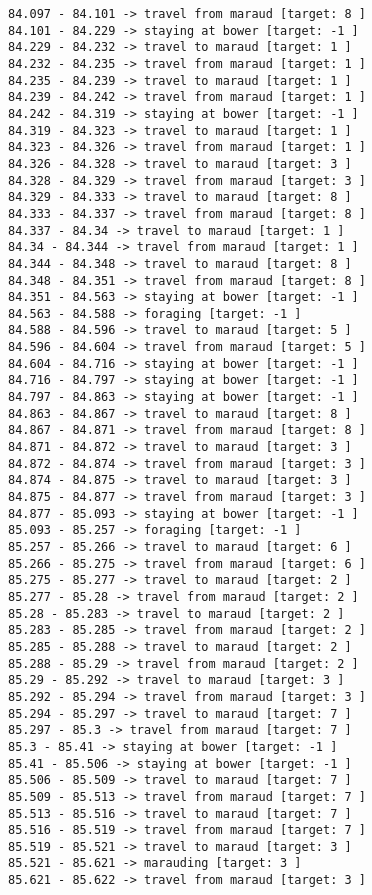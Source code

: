 \documentclass[11pt]{article}
\begin{document}
\begin{Verbatim}[commandchars=\\\{\}]
84.097 - 84.101 -> travel from maraud [target: 8 ]
84.101 - 84.229 -> staying at bower [target: -1 ]
84.229 - 84.232 -> travel to maraud [target: 1 ]
84.232 - 84.235 -> travel from maraud [target: 1 ]
84.235 - 84.239 -> travel to maraud [target: 1 ]
84.239 - 84.242 -> travel from maraud [target: 1 ]
84.242 - 84.319 -> staying at bower [target: -1 ]
84.319 - 84.323 -> travel to maraud [target: 1 ]
84.323 - 84.326 -> travel from maraud [target: 1 ]
84.326 - 84.328 -> travel to maraud [target: 3 ]
84.328 - 84.329 -> travel from maraud [target: 3 ]
84.329 - 84.333 -> travel to maraud [target: 8 ]
84.333 - 84.337 -> travel from maraud [target: 8 ]
84.337 - 84.34 -> travel to maraud [target: 1 ]
84.34 - 84.344 -> travel from maraud [target: 1 ]
84.344 - 84.348 -> travel to maraud [target: 8 ]
84.348 - 84.351 -> travel from maraud [target: 8 ]
84.351 - 84.563 -> staying at bower [target: -1 ]
84.563 - 84.588 -> foraging [target: -1 ]
84.588 - 84.596 -> travel to maraud [target: 5 ]
84.596 - 84.604 -> travel from maraud [target: 5 ]
84.604 - 84.716 -> staying at bower [target: -1 ]
84.716 - 84.797 -> staying at bower [target: -1 ]
84.797 - 84.863 -> staying at bower [target: -1 ]
84.863 - 84.867 -> travel to maraud [target: 8 ]
84.867 - 84.871 -> travel from maraud [target: 8 ]
84.871 - 84.872 -> travel to maraud [target: 3 ]
84.872 - 84.874 -> travel from maraud [target: 3 ]
84.874 - 84.875 -> travel to maraud [target: 3 ]
84.875 - 84.877 -> travel from maraud [target: 3 ]
84.877 - 85.093 -> staying at bower [target: -1 ]
85.093 - 85.257 -> foraging [target: -1 ]
85.257 - 85.266 -> travel to maraud [target: 6 ]
85.266 - 85.275 -> travel from maraud [target: 6 ]
85.275 - 85.277 -> travel to maraud [target: 2 ]
85.277 - 85.28 -> travel from maraud [target: 2 ]
85.28 - 85.283 -> travel to maraud [target: 2 ]
85.283 - 85.285 -> travel from maraud [target: 2 ]
85.285 - 85.288 -> travel to maraud [target: 2 ]
85.288 - 85.29 -> travel from maraud [target: 2 ]
85.29 - 85.292 -> travel to maraud [target: 3 ]
85.292 - 85.294 -> travel from maraud [target: 3 ]
85.294 - 85.297 -> travel to maraud [target: 7 ]
85.297 - 85.3 -> travel from maraud [target: 7 ]
85.3 - 85.41 -> staying at bower [target: -1 ]
85.41 - 85.506 -> staying at bower [target: -1 ]
85.506 - 85.509 -> travel to maraud [target: 7 ]
85.509 - 85.513 -> travel from maraud [target: 7 ]
85.513 - 85.516 -> travel to maraud [target: 7 ]
85.516 - 85.519 -> travel from maraud [target: 7 ]
85.519 - 85.521 -> travel to maraud [target: 3 ]
85.521 - 85.621 -> marauding [target: 3 ]
85.621 - 85.622 -> travel from maraud [target: 3 ]

\end{Verbatim}
\end{document}
